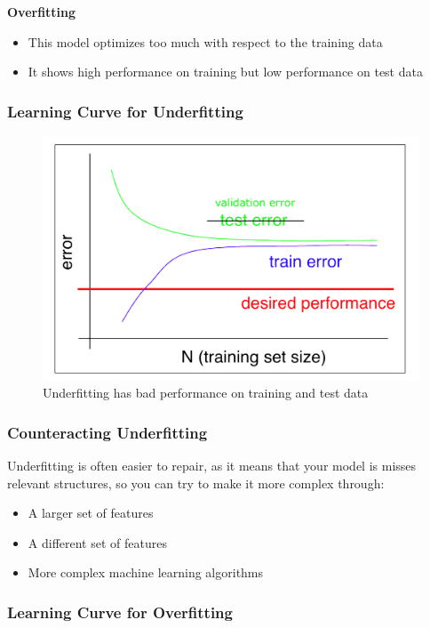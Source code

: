 \documentclass[11pt]{article}
\begin{document}
\noindent
\textbf{Overfitting}
\begin{itemize}
    \item This model optimizes too much with respect to the training data
    \item It shows high performance on training but low performance on test data
\end{itemize}

\clearpage

\subsubsection{Learning Curve for Underfitting}
     
\begin{figure}[h!]
    \centering
    \includegraphics[width=0.7\linewidth, keepaspectratio]{Pictures/underfitting_learning_curve}
    \caption{Underfitting has bad performance on training and test data}
    \label{fig:underfittinglearningcurve}
\end{figure}

\subsubsection{Counteracting Underfitting}
Underfitting is often easier to repair, as it means that your model is misses relevant structures, so you can try to make it more complex through:
\begin{itemize}
    \item A larger set of features
    \item A different set of features
    \item More complex machine learning algorithms
\end{itemize}

\subsubsection{Learning Curve for Overfitting}
\end{document}

